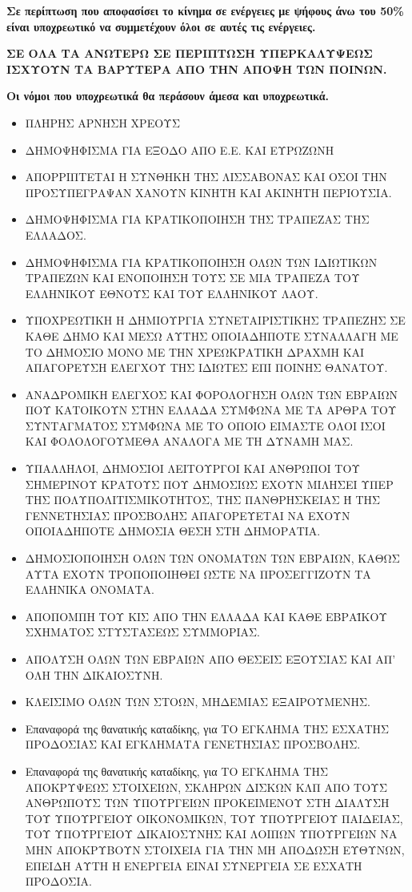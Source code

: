 \documentclass[a4paper]{article}
\begin{document}
\textbf{Σε περίπτωση που αποφασίσει το κίνημα σε ενέργειες με ψήφους άνω του 50\% είναι υποχρεωτικό να συμμετέχουν όλοι σε αυτές τις ενέργειες.}

\textbf{{\Large ΣΕ ΟΛΑ ΤΑ ΑΝΩΤΕΡΩ ΣΕ ΠΕΡΙΠΤΩΣΗ ΥΠΕΡΚΑΛΥΨΕΩΣ ΙΣΧΥΟΥΝ ΤΑ ΒΑΡΥΤΕΡΑ ΑΠΟ ΤΗΝ ΑΠΟΨΗ ΤΩΝ ΠΟΙΝΩΝ.}}


\textbf{Οι νόμοι που υποχρεωτικά θα περάσουν άμεσα και υποχρεωτικά.}
\begin{itemize}

\item  ΠΛΗΡΗΣ ΑΡΝΗΣΗ ΧΡΕΟΥΣ
\item  ΔΗΜΟΨΗΦΙΣΜΑ ΓΙΑ ΕΞΟΔΟ ΑΠΟ Ε.Ε. ΚΑΙ ΕΥΡΩΖΩΝΗ 
\item  ΑΠΟΡΡΙΠΤΕΤΑΙ Η ΣΥΝΘΗΚΗ ΤΗΣ ΛΙΣΣΑΒΟΝΑΣ ΚΑΙ ΟΣΟΙ ΤΗΝ ΠΡΟΣΥΠΕΓΡΑΨΑΝ ΧΑΝΟΥΝ ΚΙΝΗΤΗ ΚΑΙ ΑΚΙΝΗΤΗ ΠΕΡΙΟΥΣΙΑ.
\item  ΔΗΜΟΨΗΦΙΣΜΑ ΓΙΑ ΚΡΑΤΙΚΟΠΟΙΗΣΗ ΤΗΣ ΤΡΑΠΕΖΑΣ ΤΗΣ ΕΛΛΑΔΟΣ.
\item  ΔΗΜΟΨΗΦΙΣΜΑ ΓΙΑ ΚΡΑΤΙΚΟΠΟΙΗΣΗ ΟΛΩΝ ΤΩΝ ΙΔΙΩΤΙΚΩΝ ΤΡΑΠΕΖΩΝ ΚΑΙ ΕΝΟΠΟΙΗΣΗ ΤΟΥΣ ΣΕ ΜΙΑ ΤΡΑΠΕΖΑ ΤΟΥ ΕΛΛΗΝΙΚΟΥ ΕΘΝΟΥΣ ΚΑΙ ΤΟΥ ΕΛΛΗΝΙΚΟΥ ΛΑΟΥ.
\item  ΥΠΟΧΡΕΩΤΙΚΗ Η ΔΗΜΙΟΥΡΓΙΑ ΣΥΝΕΤΑΙΡΙΣΤΙΚΗΣ ΤΡΑΠΕΖΗΣ ΣΕ ΚΑΘΕ ΔΗΜΟ ΚΑΙ ΜΕΣΩ ΑΥΤΗΣ ΟΠΟΙΑΔΗΠΟΤΕ ΣΥΝΑΛΛΑΓΗ ΜΕ ΤΟ ΔΗΜΟΣΙΟ ΜΟΝΟ ΜΕ ΤΗΝ ΧΡΕΩΚΡΑΤΙΚΗ ΔΡΑΧΜΗ ΚΑΙ ΑΠΑΓΟΡΕΥΣΗ ΕΛΕΓΧΟΥ ΤΗΣ ΙΔΙΩΤΕΣ ΕΠΙ ΠΟΙΝΗΣ ΘΑΝΑΤΟΥ.
\item  ΑΝΑΔΡΟΜΙΚΗ ΕΛΕΓΧΟΣ ΚΑΙ ΦΟΡΟΛΟΓΗΣΗ ΟΛΩΝ ΤΩΝ ΕΒΡΑΙΩΝ ΠΟΥ ΚΑΤΟΙΚΟΥΝ ΣΤΗΝ ΕΛΛΑΔΑ ΣΥΜΦΩΝΑ ΜΕ ΤΑ ΑΡΘΡΑ ΤΟΥ ΣΥΝΤΑΓΜΑΤΟΣ ΣΥΜΦΩΝΑ ΜΕ ΤΟ ΟΠΟΙΟ ΕΙΜΑΣΤΕ ΟΛΟΙ ΙΣΟΙ ΚΑΙ ΦΟΛΟΛΟΓΟΥΜΕΘΑ ΑΝΑΛΟΓΑ ΜΕ ΤΗ ΔΥΝΑΜΗ ΜΑΣ.
\item  ΥΠΑΛΛΗΛΟΙ, ΔΗΜΟΣΙΟΙ ΛΕΙΤΟΥΡΓΟΙ ΚΑΙ ΑΝΘΡΩΠΟΙ ΤΟΥ ΣΗΜΕΡΙΝΟΥ ΚΡΑΤΟΥΣ ΠΟΥ ΔΗΜΟΣΙΩΣ ΕΧΟΥΝ ΜΙΛΗΣΕΙ ΥΠΕΡ ΤΗΣ ΠΟΛΥΠΟΛΙΤΙΣΜΙΚΟΤΗΤΟΣ, ΤΗΣ ΠΑΝΘΡΗΣΚΕΙΑΣ Ή ΤΗΣ ΓΕΝΝΕΤΗΣΙΑΣ ΠΡΟΣΒΟΛΗΣ ΑΠΑΓΟΡΕΥΕΤΑΙ ΝΑ ΕΧΟΥΝ ΟΠΟΙΑΔΗΠΟΤΕ ΔΗΜΟΣΙΑ ΘΕΣΗ ΣΤΗ ΔΗΜΟΡΑΤΙΑ.
\item  ΔΗΜΟΣΙΟΠΟΙΗΣΗ ΟΛΩΝ ΤΩΝ ΟΝΟΜΑΤΩΝ ΤΩΝ ΕΒΡΑΙΩΝ, ΚΑΘΩΣ ΑΥΤΑ ΕΧΟΥΝ ΤΡΟΠΟΠΟΙΗΘΕΙ ΩΣΤΕ ΝΑ ΠΡΟΣΕΓΓΙΖΟΥΝ ΤΑ ΕΛΛΗΝΙΚΑ ΟΝΟΜΑΤΑ.
\item  ΑΠΟΠΟΜΠΗ ΤΟΥ ΚΙΣ ΑΠΟ ΤΗΝ ΕΛΛΑΔΑ ΚΑΙ ΚΑΘΕ ΕΒΡΑΪΚΟΥ ΣΧΗΜΑΤΟΣ ΣΤΥΣΤΑΣΕΩΣ ΣΥΜΜΟΡΙΑΣ.
\item  ΑΠΟΛΥΣΗ ΟΛΩΝ ΤΩΝ ΕΒΡΑΙΩΝ ΑΠΟ ΘΕΣΕΙΣ ΕΞΟΥΣΙΑΣ ΚΑΙ ΑΠ' ΟΛΗ ΤΗΝ ΔΙΚΑΙΟΣΥΝΗ.
\item  ΚΛΕΙΣΙΜΟ ΟΛΩΝ ΤΩΝ ΣΤΟΩΝ, ΜΗΔΕΜΙΑΣ ΕΞΑΙΡΟΥΜΕΝΗΣ.
\item  Επαναφορά της θανατικής καταδίκης, για ΤΟ ΕΓΚΛΗΜΑ ΤΗΣ ΕΣΧΑΤΗΣ ΠΡΟΔΟΣΙΑΣ ΚΑΙ ΕΓΚΛΗΜΑΤΑ ΓΕΝΕΤΗΣΙΑΣ ΠΡΟΣΒΟΛΗΣ.
\item  Επαναφορά της θανατικής καταδίκης, για ΤΟ ΕΓΚΛΗΜΑ ΤΗΣ ΑΠΟΚΡΥΨΕΩΣ ΣΤΟΙΧΕΙΩΝ, ΣΚΛΗΡΩΝ ΔΙΣΚΩΝ ΚΛΠ ΑΠΟ ΤΟΥΣ ΑΝΘΡΩΠΟΥΣ ΤΩΝ ΥΠΟΥΡΓΕΙΩΝ ΠΡΟΚΕΙΜΕΝΟΥ ΣΤΗ ΔΙΑΛΥΣΗ ΤΟΥ ΥΠΟΥΡΓΕΙΟΥ ΟΙΚΟΝΟΜΙΚΩΝ, ΤΟΥ ΥΠΟΥΡΓΕΙΟΥ ΠΑΙΔΕΙΑΣ, ΤΟΥ ΥΠΟΥΡΓΕΙΟΥ ΔΙΚΑΙΟΣΥΝΗΣ ΚΑΙ ΛΟΙΠΩΝ ΥΠΟΥΡΓΕΙΩΝ ΝΑ ΜΗΝ ΑΠΟΚΡΥΒΟΥΝ ΣΤΟΙΧΕΙΑ ΓΙΑ ΤΗΝ  ΜΗ ΑΠΟΔΩΣΗ ΕΥΘΥΝΩΝ, ΕΠΕΙΔΗ ΑΥΤΗ Η ΕΝΕΡΓΕΙΑ ΕΙΝΑΙ ΣΥΝΕΡΓΕΙΑ ΣΕ ΕΣΧΑΤΗ ΠΡΟΔΟΣΙΑ.

\end{itemize}
\end{document}
